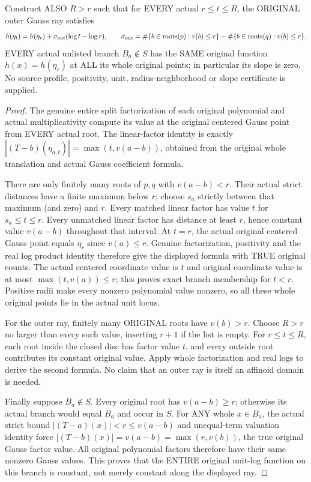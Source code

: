\begin{theorem}
Construct ALSO $R>r$ such that for EVERY actual $r\le t\le R$, the ORIGINAL
outer Gauss ray satisfies
\[
 h(\eta_t)=h(\eta_r)+\sigma_{\rm out}(\log t-\log r),
 \qquad
 \sigma_{\rm out}=\#\{b\in\operatorname{roots}(p):v(b)\le r\}
                 -\#\{b\in\operatorname{roots}(q):v(b)\le r\}.
\]
EVERY actual unlisted branch $B_a\notin S$ has the SAME original function
$h(x)=h(\eta_r)$ at ALL its whole original points; in particular its slope
is zero. No source profile, positivity, unit, radius-neighborhood or slope
certificate is supplied.
\end{theorem}
\begin{proof}
The genuine entire split factorization of each original polynomial and
actual multiplicativity compute its value at the original centered Gauss
point from EVERY actual root. The linear-factor identity is exactly
$|(T-b)(\eta_{a,t})|=\max(t,v(a-b))$, obtained from the original whole
translation and actual Gauss coefficient formula.

There are only finitely many roots of $p,q$ with $v(a-b)<r$. Their actual
strict distances have a finite maximum below $r$; choose $s_a$ strictly
between that maximum (and zero) and $r$. Every matched linear factor has
value $t$ for $s_a\le t\le r$. Every unmatched linear factor has distance
at least $r$, hence constant value $v(a-b)$ throughout that interval.
At $t=r$, the actual original centered Gauss point equals $\eta_r$ since
$v(a)\le r$. Genuine factorization, positivity and the real log product
identity therefore give the displayed formula with TRUE original counts.
The actual centered coordinate value is $t$ and original coordinate value
is at most $\max(t,v(a))\le r$; this proves exact branch membership for
$t<r$. Positive radii make every nonzero polynomial value nonzero, so all
these whole original points lie in the actual unit locus.

For the outer ray, finitely many ORIGINAL roots have $v(b)>r$. Choose
$R>r$ no larger than every such value, inserting $r+1$ if the list is empty.
For $r\le t\le R$, each root inside the closed disc has factor value $t$,
and every outside root contributes its constant original value. Apply
whole factorization and real logs to derive the second formula. No claim
that an outer ray is itself an affinoid domain is needed.

Finally suppose $B_a\notin S$. Every original root has $v(a-b)\ge r$;
otherwise its actual branch would equal $B_a$ and occur in $S$. For ANY
whole $x\in B_a$, the actual strict bound $|(T-a)(x)|<r\le v(a-b)$
and unequal-term valuation identity force
$|(T-b)(x)|=v(a-b)=\max(r,v(b))$, the true original Gauss factor value.
All original polynomial factors therefore have their same nonzero Gauss
values. This proves that the ENTIRE original unit-log function on this
branch is constant, not merely constant along the displayed ray.
\end{proof}

